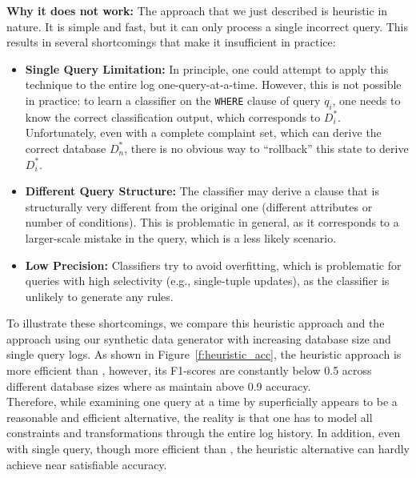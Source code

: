 \smallskip
\noindent
\textbf{Why it does not work:}
The approach that we just described is heuristic in nature. It
is simple and fast, but it can only process a single incorrect query.
This results in several shortcomings that make it insufficient in
practice:
\begin{itemize}[itemsep=1pt, leftmargin=5mm]
    
\item \textbf{Single Query Limitation: }
In principle, one could attempt to apply this technique to the
entire log one-query-at-a-time. However, this is not possible in
practice: to learn a classifier on the \texttt{WHERE} clause of query
$q_i$, one needs to know the correct classification output, which
corresponds to $D_i^*$. Unfortunately, even with a complete complaint
set, which can derive the correct database $D_n^*$, there is no
obvious way to ``rollback'' this state to derive $D_i^*$.

\item \textbf{Different Query Structure: } 
The classifier may derive a clause that is structurally very
different from the original one (different attributes or number of
conditions). This is problematic in general, as it corresponds to a
larger-scale mistake in the query, which is a less likely scenario.

\item \textbf{Low Precision: }
Classifiers try to avoid overfitting, which is problematic for
queries with high selectivity (e.g., single-tuple updates), as the
classifier is unlikely to generate any rules.
\end{itemize}

To illustrate these shortcomings, we compare this heuristic approach and the \sys approach
using our synthetic data generator with increasing database size 
and single query logs. As shown in Figure~\ref{f:heuristic_acc}, the heuristic approach
is more efficient than \sys, however, its
F1-scores are constantly below 0.5 across
different database sizes where as \sys maintain above 0.9 accuracy. \\
Therefore, while examining one query at a time by  
superficially appears
to be a reasonable and efficient alternative, 
the reality is that one
has to model all constraints and transformations through the entire
log history. In addition, even with single query, though more efficient than \sys, 
the heuristic alternative can hardly achieve near satisfiable accuracy. 

